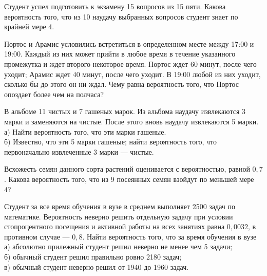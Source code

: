 \newpage\setcounter{zad}{0}



\begin{zkrW}{20}\noindent 
	Студент успел подготовить к экзамену 15 вопросов из 15 пяти. Какова вероятность того, что из 10 наудачу выбранных вопросов студент знает по крайней мере 4.
 
\end{zkrW}

\begin{zkrW}{20}\noindent 
	Портос и Арамис условились встретиться в определенном месте между 17:00 и 19:00. Каждый из них может прийти в любое время в течение указанного промежутка и ждет второго некоторое время. Портос ждет 60 минут, после чего уходит; Арамис ждет 40 минут, после чего уходит. В 19:00 любой из них уходит, сколько бы до этого он ни ждал. Чему равна вероятность того, что Портос опоздает более чем на полчаса?
 
\end{zkrW}

\begin{zkrW}{20}\noindent 
	В альбоме 11 чистых и 7 гашеных марок. Из альбома наудачу извлекаются 3 марки и заменяются на чистые. После этого вновь наудачу извлекаются 5 марки. \\ \indent а) Найти вероятность того, что эти марки гашеные. \\ \indent б) Известно, что эти 5 марки гашеные; найти вероятность того, что первоначально извлеченные 3 марки --- чистые.
 
\end{zkrW}

\begin{zkrW}{20}\noindent 
	Всхожесть семян данного сорта растений оценивается с вероятностью, равной $0{,}7$. Какова вероятность того, что из 9 посеянных семян взойдут по меньшей мере 4?
 
\end{zkrW}

\begin{zkrW}{20}\noindent 
	Студент за все время обучения в вузе в среднем выполняет 2500 задач по математике. Вероятность неверно решить отдельную задачу при условии стопроцентного посещения и активной работы на всех занятиях равна $0{,}0032$, в противном случае --- $0{,}8$. Найти вероятность того, что за время обучения в вузе \\ \indent а) абсолютно прилежный студент решил неверно не менее чем 5 задачи; \\ \indent б) обычный студент решил правильно ровно 2180 задач; \\ \indent в) обычный студент неверно решил от 1940 до 1960 задач.
 
\end{zkrW}

